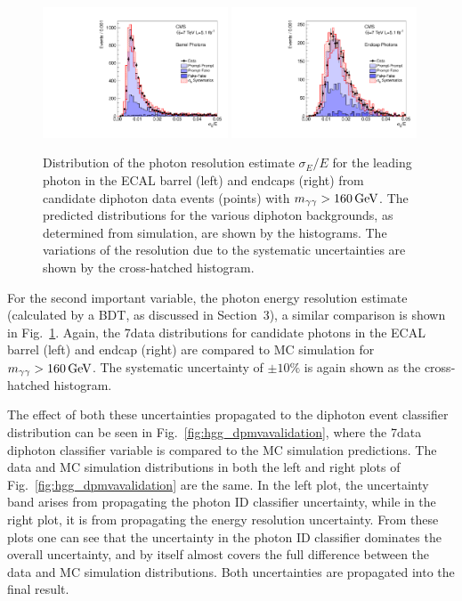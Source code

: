 \documentclass[12pt,twoside,a4paper,cmspaper,final,collab]{cms-tdr}
\begin{document}
\begin{figure}
 \begin{center}
   \includegraphics[width=0.49\textwidth]{figures/hgg_phsige1eb}
   \includegraphics[width=0.49\textwidth]{figures/hgg_phsige1ee}
   \caption{
Distribution of the photon resolution estimate $\sigma_E/E$ for the leading photon in the
ECAL barrel (left) and endcaps (right) from candidate diphoton data
events (points) with $m_{\gamma\gamma}>160\,\text{Ge\hspace{-.08em}V}$.
The predicted distributions for the various diphoton backgrounds, as determined from simulation, are shown by the histograms.
The variations of the resolution due to the systematic uncertainties are shown by the cross-hatched histogram.}
   \label{fig:hgg_sigescale}
 \end{center}
\end{figure}


For the second important variable, the photon energy resolution estimate (calculated by a BDT, as discussed in Section~3),
a similar comparison is shown in Fig.~\ref{fig:hgg_sigescale}. Again, the 7\TeV data distributions for candidate
photons in the ECAL barrel (left) and endcap (right) are compared to MC simulation for $m_{\gamma\gamma}>160\,\text{Ge\hspace{-.08em}V}$.
The systematic uncertainty of ${\pm}10\%$ is again shown as the
cross-hatched histogram.

The effect of both these uncertainties propagated to the diphoton event classifier distribution
can be seen in Fig.~\ref{fig:hgg_dpmvavalidation}, where the 7\TeV data diphoton classifier variable is
compared to the MC simulation predictions. The data and MC simulation distributions in both the left and right plots of
Fig.~\ref{fig:hgg_dpmvavalidation} are the same. In the left plot, the uncertainty band arises from
propagating the photon ID classifier uncertainty, while in the right plot, it is
from propagating the energy resolution uncertainty.
From these plots one can see that the uncertainty in the photon ID classifier dominates the overall uncertainty,
and by itself almost covers the full difference between the data and MC simulation distributions.
Both uncertainties are propagated into the final result.
\end{document}
